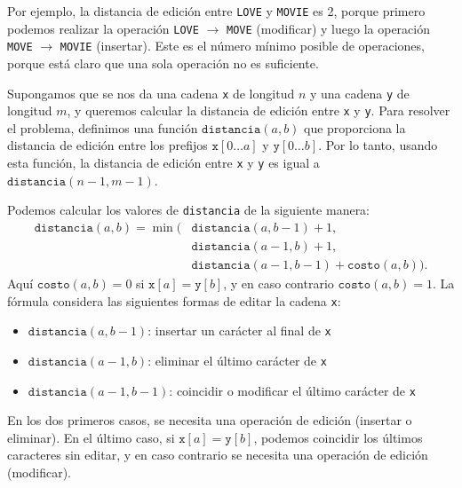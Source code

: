 Por ejemplo, la distancia de edición entre
\texttt{LOVE} y \texttt{MOVIE} es 2,
porque primero podemos realizar la operación
 \texttt{LOVE} $\rightarrow$ \texttt{MOVE}
(modificar) y luego la operación
\texttt{MOVE} $\rightarrow$ \texttt{MOVIE}
(insertar).
Este es el número mínimo posible de operaciones,
porque está claro que una sola operación no es suficiente.

Supongamos que se nos da una cadena \texttt{x}
de longitud $n$ y una cadena \texttt{y} de longitud $m$,
y queremos calcular la distancia de edición entre
\texttt{x} y \texttt{y}.
Para resolver el problema, definimos una función
$\texttt{distancia}(a,b)$ que proporciona la
distancia de edición entre los prefijos
$\texttt{x}[0 \ldots a]$ y $\texttt{y}[0 \ldots b]$.
Por lo tanto, usando esta función, la distancia de edición
entre \texttt{x} y \texttt{y} es igual a $\texttt{distancia}(n-1,m-1)$.

Podemos calcular los valores de \texttt{distancia}
de la siguiente manera:
\begin{equation*}
\begin{split}
\texttt{distancia}(a,b) = \min(& \texttt{distancia}(a,b-1)+1, \\
                           & \texttt{distancia}(a-1,b)+1, \\
                           & \texttt{distancia}(a-1,b-1)+\texttt{costo}(a,b)).
\end{split}
\end{equation*}
Aquí $\texttt{costo}(a,b)=0$ si $\texttt{x}[a]=\texttt{y}[b]$,
y en caso contrario $\texttt{costo}(a,b)=1$.
La fórmula considera las siguientes formas de
editar la cadena \texttt{x}:
\begin{itemize}
\item $\texttt{distancia}(a,b-1)$: insertar un carácter al final de \texttt{x}
\item $\texttt{distancia}(a-1,b)$: eliminar el último carácter de \texttt{x}
\item $\texttt{distancia}(a-1,b-1)$: coincidir o modificar el último carácter de \texttt{x}
\end{itemize}
En los dos primeros casos, se necesita una operación de edición
(insertar o eliminar).
En el último caso, si $\texttt{x}[a]=\texttt{y}[b]$,
podemos coincidir los últimos caracteres sin editar,
y en caso contrario se necesita una operación de edición (modificar).

